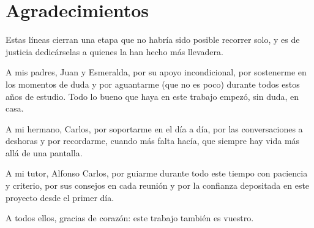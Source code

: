 \chapter*{Agradecimientos}

Estas líneas cierran una etapa que no habría sido posible recorrer solo, y es de justicia dedicárselas a quienes la han hecho más llevadera.

A mis padres, Juan y Esmeralda, por su apoyo incondicional, por sostenerme en los momentos de duda y por aguantarme (que no es poco) durante todos estos años de estudio. Todo lo bueno que haya en este trabajo empezó, sin duda, en casa.

A mi hermano, Carlos, por soportarme en el día a día, por las conversaciones a deshoras y por recordarme, cuando más falta hacía, que siempre hay vida más allá de una pantalla.

A mi tutor, Alfonso Carlos, por guiarme durante todo este tiempo con paciencia y criterio, por sus consejos en cada reunión y por la confianza depositada en este proyecto desde el primer día.

A todos ellos, gracias de corazón: este trabajo también es vuestro.
